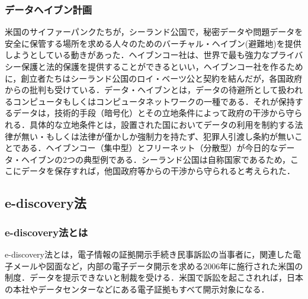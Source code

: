 \subsubsection{データヘイブン計画}
米国のサイファーパンクたちが，シーランド公国で，秘密データや問題データを安全に保管する場所を求める人々のためのバーチャル・ヘイブン(避難地)を提供しようとしている動きがあった．ヘイブンコー社は、世界で最も強力なプライバシー保護と法的保護を提供することができるといい，ヘイブンコー社を作るために，創立者たちはシーランド公国のロイ・ベーツ公と契約を結んだが，各国政府からの批判も受けている\cite{sealand}．データ・ヘイブンとは，データの待避所として扱われるコンピュータもしくはコンピュータネットワークの一種である．それが保持するデータは，技術的手段（暗号化）とその立地条件によって政府の干渉から守られる．具体的な立地条件とは，設置された国においてデータの利用を制約する法律が無い・もしくは法律が僅かしか強制力を持たず、犯罪人引渡し条約が無いことである．ヘイブンコー（集中型）とフリーネット（分散型）が今日的なデータ・ヘイブンの2つの典型例である\cite{dataheaven}．シーランド公国は自称国家であるため，ここにデータを保存すれば，他国政府等からの干渉から守られると考えられた．


\subsection{e-discovery法}
\subsubsection{e-discovery法とは}
e-discovery法とは，電子情報の証拠開示手続き民事訴訟の当事者に，関連した電子メールや図面など，内部の電子データ開示を求める2006年に施行された米国の制度．データを提示できないと制裁を受ける．米国で訴訟を起こされれば，日本の本社やデータセンターなどにある電子証拠もすべて開示対象になる\cite{ediscovery}．
